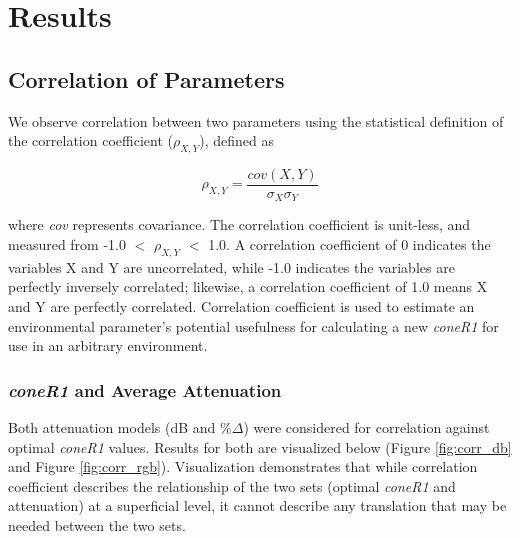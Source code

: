 \documentclass[12pt]{report}
\begin{document}
\doublespacing

\clearpage
\chapter{Results}

\section{Correlation of Parameters}

We observe correlation between two parameters using the statistical definition of the correlation coefficient ($\rho_{X,Y}$), defined as

\begin{equation}
\rho_{X,Y} = \dfrac{cov(X,Y)}{\sigma_X\sigma_Y}
\end{equation}

where \textit{cov} represents covariance. The correlation coefficient is unit-less, and measured from -1.0 $<$ $\rho_{X,Y}$ $<$ 1.0. A correlation coefficient of 0 indicates the variables X and Y are uncorrelated, while -1.0 indicates the variables are perfectly inversely correlated; likewise, a correlation coefficient of 1.0 means X and Y are perfectly correlated. Correlation coefficient is used to estimate an environmental parameter's potential usefulness for calculating a new \textit{coneR1} for use in an arbitrary environment.

\subsection{\textit{coneR1} and Average Attenuation} \label{section:coner1andatten}

Both attenuation models (dB and \%$\Delta$) were considered for correlation against optimal \textit{coneR1} values. Results for both are visualized below (Figure \ref{fig:corr_db} and Figure \ref{fig:corr_rgb}). Visualization demonstrates that while correlation coefficient describes the relationship of the two sets (optimal \textit{coneR1} and attenuation) at a superficial level, it cannot describe any translation that may be needed between the two sets.
\end{document}
